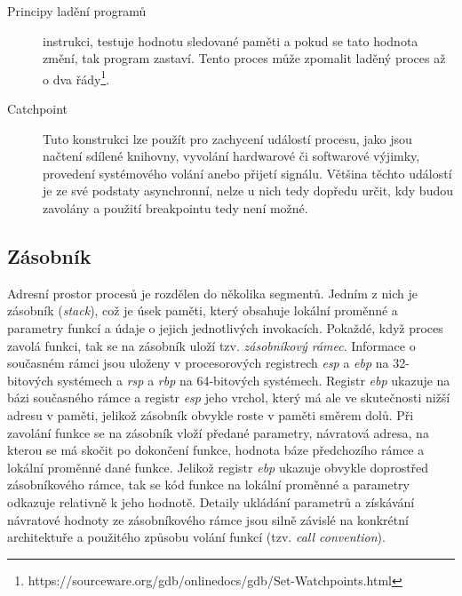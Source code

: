 \documentclass[bc,male,python,dept460]{diploma}						%
\begin{document}
\begin{section}{Principy ladění programů}
\begin{description}
				instrukci, testuje hodnotu sledované paměti a pokud se tato hodnota změní, tak program zastaví. Tento proces může zpomalit laděný proces až o
				dva řády\footnote{https://sourceware.org/gdb/onlinedocs/gdb/Set-Watchpoints.html}.
			\item[Catchpoint]
				Tuto konstrukci lze použít pro zachycení událostí procesu, jako jsou načtení sdílené knihovny, vyvolání hardwarové či softwarové výjimky, provedení
				systémového volání anebo přijetí signálu. Většina těchto událostí je ze své podstaty asynchronní, nelze u nich tedy dopředu určit, kdy budou zavolány
				a použití breakpointu tedy není možné.
		\end{description}
		
	\subsection{Zásobník}
		Adresní prostor procesů je rozdělen do několika segmentů\cite[53]{tanenbaum}. Jedním z nich je zásobník (\textit{stack}), což je úsek paměti, který
		obsahuje lokální proměnné a parametry funkcí a údaje o jejich jednotlivých invokacích. Pokaždé, když proces zavolá funkci, tak se na zásobník uloží tzv.
		\textit{zásobníkový rámec}. Informace o současném rámci jsou uloženy v procesorových registrech \textit{esp} a \textit{ebp} na 32-bitových systémech
		a \textit{rsp} a \textit{rbp} na 64-bitových systémech. Registr \textit{ebp} ukazuje na bázi současného rámce a registr \textit{esp} jeho vrchol, který
		má ale ve skutečnosti nižší adresu v paměti, jelikož zásobník obvykle roste v paměti směrem dolů. Při zavolání funkce se na zásobník vloží předané parametry,
		návratová adresa, na kterou se má skočit po dokončení funkce, hodnota báze předchozího rámce a lokální proměnné dané funkce.
		Jelikož registr \textit{ebp} ukazuje obvykle doprostřed zásobníkového rámce, tak se kód funkce na lokální proměnné a parametry odkazuje
		relativně k jeho hodnotě. Detaily ukládání parametrů a získávání návratové hodnoty ze zásobníkového rámce jsou silně závislé na konkrétní architektuře
		a použitého způsobu volání funkcí (tzv. \textit{call convention}).
		
		

\end{section}
\end{document}
